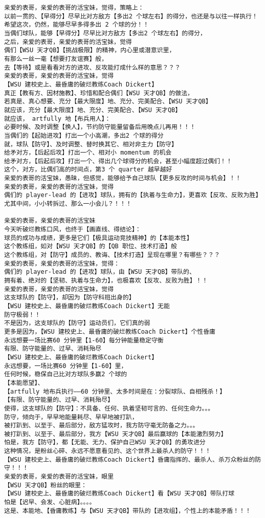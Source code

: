 \documentclass[9pt, b5paper]{article}
\begin{document}
\begin{verbatim}
亲爱的表哥，亲爱的表哥的活宝妹，觉得，策略上：
以前一贯的、【早得分】尽早比对方敌方【多出2 个球左右】的得分，也还是与以往一样执行！
希望这次，仍然，能够尽早多得多出 2 个球的分！！
当偶们球队，能够【早得分】尽早比对方敌方【多出2 个球左右】的得分，
之后，亲爱的表哥，亲爱的表哥的活宝妹，觉得
偶们【WSU 天才QB】【挑战极限】的精神，内心里或潜意识里，
有那么一丝一毫【想要打友谊赛】般，
去【等待】或是看看对方的进攻、反攻能打成什么样的意思？？？
亲爱的表哥，亲爱的表哥的活宝妹，觉得
【WSU 建校史上、最昏庸的破烂教练Coach Dickert】
真正【教有方、因材施教】、珍惜和配合偶们【WSU 天才QB】的做法，
若真是、真心想要、充分【最大限度】地、充分、完美配合、【WSU 天才QB】
就应该，充分【最大限度】地、充分、完美配合、【WSU 天才QB】
就应该， artfully 地【布兵用人】：
必要时候、及时调整【换人】，节约防守能量留备后用晚点儿再用！！！
当偶们的【起始进攻】打出一个小高潮，多出2 个球的得分
就，球队【防守】、及时调整、替时换其它、相对非主力【防守】
给矛对方，【后起后攻】打出一个、相对小 momentum 的机会
给矛对方，【后起后攻】打出一个、得出几个球得分的机会，甚至小幅度超过偶们！！
这个，对方，比偶们高的时间点，第3 个 quarter 越早越好
亲爱的表哥的活宝妹，愚昧，但感觉，能够给予自己球队【更多反攻的时间与机会】！！
亲爱的表哥，亲爱的表哥的活宝妹，觉得
偶们的 player-lead 的【进攻】球队，拥有的【执着与生命力】，更喜欢【反攻、反败为胜】
尤其中间，小小转拆过、那么一小会儿？！！！

亲爱的表哥，亲爱的表哥的活宝妹
今天听破烂教练口风，也终于【画直线、得结论】：
球员的成功与成绩，更多是它们【极具运动竞技精神】的【本能本性】
这个教练组，如对【WSU 天才QB】的【QB 职位、技术打造】般
这个教练组，对【防守】成员的、教诲、【技术打造】呈现在哪里？有哪些？？？
亲爱的表哥，亲爱的表哥的活宝妹，觉得：
偶们的 player-lead 的【进攻】球队，由【WSU 天才QB】带队的、
拥有着、绝对的【坚韧、执着与生命力】，也极喜欢【反攻、反败为胜】！！
亲爱的表哥，亲爱的表哥的活宝妹，觉得
这支球队的【防守】，却因为【防守科班出身的】
【WSU 建校史上、最昏庸的破烂教练Coach Dickert】无能
防守极弱！！
不是因为，这支球队的【防守】运动员们，它们真的弱
更多是因为，【WSU 建校史上、最昏庸的破烂教练Coach Dickert】个性昏庸
永远想要一场比赛60 分钟里【1-60】每分钟能量稳定守衡
有限、防守能量的、过早、消耗殆尽
【WSU 建校史上、最昏庸的破烂教练Coach Dickert】
永远想要，一场比赛60 分钟里【1-60】里，
任何时候，稳保自己比对方球队多赢2 个球的
【本能愿望】、
【artfully 地布兵执行——60 分钟里、太多时间是在：分裂球队、自相残杀！】
【有限、防守能量的、过早、消耗殆尽】
使得，这支球队的【防守】：不具备、任何、执着坚韧可言的、任何生命力。。。
防守，倾向于，早早地能量耗尽、早早地被打趴，
被打趴到、以至于、最后部分，敌方猛攻时，我方防守毫无防备之力。。。
被打趴到、以至于、最后部分，我方【WSU 天才QB】最后赢球的【本能激烈努力】
怕是，我方【防守】，都【无能、无力、保护自己WSU 天才QB】的勇攻进分
这种情况，是粉丝心碎、永远不愿意看见的、这个世界上最杀人的防守！！！
【WSU 建校史上、最昏庸的破烂教练Coach Dickert】昏庸指挥的、最杀人、杀万众粉丝的防守！！！
亲爱的表哥，亲爱的表哥的活宝妹，眼里
【WSU 天才QB】粉丝的眼里：
【WSU 建校史上、最昏庸的破烂教练Coach Dickert】看【WSU 天才QB】带队打球
怕是【迟早、会发、心脏病】。。。。
这是、本能地、【昏庸教练】与【WSU 天才QB】带队的【进攻组】，个性上的本能矛盾！！！


\end{verbatim}
\end{document}
